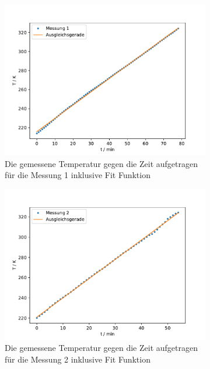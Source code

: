 \begin{figure}
  \label{fig:2-linregress}
  \centering
  \begin{subfigure}[b]{0.45\textwidth}
      \centering
      \includegraphics[width=\textwidth]{build_j/zeit_temp_fit_1.pdf}
      \caption{Die gemessene Temperatur gegen die Zeit aufgetragen für die Messung 1 inklusive Fit Funktion}
  \end{subfigure}
  \hfill
  \begin{subfigure}[b]{0.45\textwidth}
      \centering
      \includegraphics[width=\textwidth]{build_j/zeit_temp_fit_2.pdf}
      \caption{Die gemessene Temperatur gegen die Zeit aufgetragen für die Messung 2 inklusive Fit Funktion}
  \end{subfigure}
  \caption{}
\end{figure}


